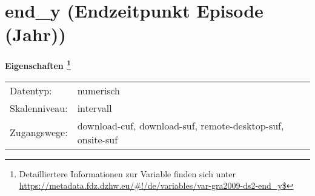 
    \setcounter{footnote}{0}

    \vspace*{-1.8cm}
	\section{end\_y (Endzeitpunkt Episode (Jahr))}
	\label{section:end_y}



    \vspace*{0.5cm}
    \noindent\textbf{Eigenschaften
	\footnote{Detailliertere Informationen zur Variable finden sich unter
		\url{https://metadata.fdz.dzhw.eu/\#!/de/variables/var-gra2009-ds2-end_y$}}}\\
	\begin{tabularx}{\hsize}{@{}lX}
	Datentyp: & numerisch \\
	Skalenniveau: & intervall \\
	Zugangswege: &
	  download-cuf, 
	  download-suf, 
	  remote-desktop-suf, 
	  onsite-suf
 \\
    \end{tabularx}



